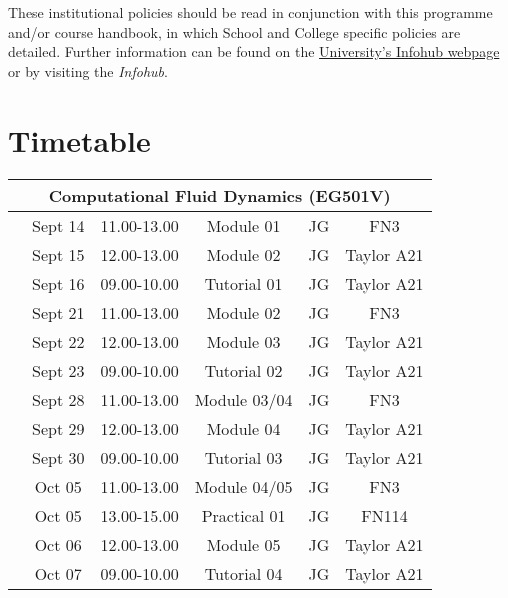 \documentclass[12pts,a4paper,amsmath,amssymb,floatfix]{article}%
\begin{document}
These institutional policies should be read in conjunction with this programme and/or course handbook, in which School and College specific policies are detailed. Further information can be found on the \href{http:www.abdn.ac.uk/infohub/}{University's Infohub webpage} or by visiting the {\it Infohub}.

\clearpage




\section{Timetable}

\begin{center}
\begin{tabular}{||c||c|c|c|c|c||} 
\hline\hline
\multicolumn{6}{||c||}{Computational Fluid Dynamics (EG501V)} \\
\hline\hline
\multirow{3}{*}{\color{red}{Week 7}}  & Sept 14   & 11.00-13.00 & Module 01   & JG  & FN3   \\
                                      & Sept 15   & 12.00-13.00 & Module 02   & JG  & Taylor A21 \\
                                      & Sept 16   & 09.00-10.00 & Tutorial 01 & JG  & Taylor A21 \\
\hline
\multirow{3}{*}{\color{red}{Week 8}}  & Sept 21   & 11.00-13.00 & Module 02   & JG  & FN3 \\
                                      & Sept 22   & 12.00-13.00 & Module 03   & JG  & Taylor A21 \\
                                      & Sept 23   & 09.00-10.00 & Tutorial 02 & JG  & Taylor A21 \\
\hline
\multirow{3}{*}{\color{red}{Week 9}}  & Sept 28   & 11.00-13.00 & Module 03/04 & JG  & FN3 \\
                                      & Sept 29   & 12.00-13.00 & Module 04   & JG  & Taylor A21 \\
                                      & Sept 30   & 09.00-10.00 & Tutorial 03 & JG  & Taylor A21 \\
\hline
\multirow{3}{*}{\color{red}{Week 10}} & Oct 05    & 11.00-13.00 & Module 04/05 & JG & FN3 \\
                                      & Oct 05    & 13.00-15.00 & Practical 01 & JG & FN114 \\
                                      & Oct 06    & 12.00-13.00 & Module 05   & JG  & Taylor A21 \\
                                      & Oct 07    & 09.00-10.00 & Tutorial 04 & JG  & Taylor A21 \\

\end{tabular}
\end{center}
\end{document}

